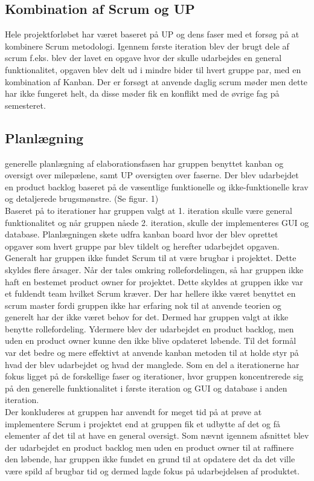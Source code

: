 \subsection{Kombination af Scrum og UP}
Hele projektforløbet har været baseret på UP og dens faser med et forsøg på at kombinere Scrum metodologi. Igennem første iteration blev der brugt dele af scrum f.eks. blev der lavet en opgave hvor der skulle udarbejdes en general funktionalitet, opgaven blev delt ud i mindre bider til hvert gruppe par, med en kombination af Kanban. Der er forsøgt at anvende daglig scrum møder men dette har ikke fungeret helt, da disse møder fik en konflikt med de øvrige fag på semesteret. 
\subsection{Planlægning}
generelle planlægning af elaborationsfasen har gruppen benyttet kanban og oversigt over milepælene, samt UP oversigten over faserne. Der blev udarbejdet en product backlog baseret på de væsentlige funktionelle og ikke-funktionelle krav og detaljerede brugsmønstre. (Se figur. 1)\\
Baseret på to iterationer har gruppen valgt at 1. iteration skulle være general funktionalitet og når gruppen nåede 2. iteration, skulle der implementeres GUI og database. Planlægningen skete udfra kanban board hvor der blev oprettet opgaver som hvert gruppe par blev tildelt og herefter udarbejdet opgaven. \\
Generalt har gruppen ikke fundet Scrum til at være brugbar i projektet. Dette skyldes flere årsager. Når der tales omkring rollefordelingen, så har gruppen ikke haft en bestemet product owner for projektet. Dette skyldes at gruppen ikke var et fuldendt team hvilket Scrum kræver. Der har hellere ikke været benyttet en scrum master fordi gruppen ikke har erfaring nok til at anvende teorien og generelt har der ikke været behov for det. Dermed har gruppen valgt at ikke benytte rollefordeling. Ydermere blev der udarbejdet en product backlog, men uden en product owner kunne den ikke blive opdateret løbende. Til det formål var det bedre og mere effektivt at anvende kanban metoden til at holde styr på hvad der blev udarbejdet og hvad der manglede. Som en del a iterationerne har fokus ligget på de forskellige faser og iterationer, hvor gruppen koncentrerede sig på den generelle funktionalitet i første iteration og GUI og database i anden iteration.\\
Der konkluderes at gruppen har anvendt for meget tid på at prøve at implementere Scrum i projektet end at gruppen fik et udbytte af det og få elementer af det til at have en general oversigt. Som nævnt igennem afsnittet blev der udarbejdet en product backlog men uden en product owner til at raffinere den løbende, har gruppen ikke fundet en grund til at opdatere det da det ville være spild af brugbar tid og dermed lagde fokus på udarbejdelsen af produktet. 
